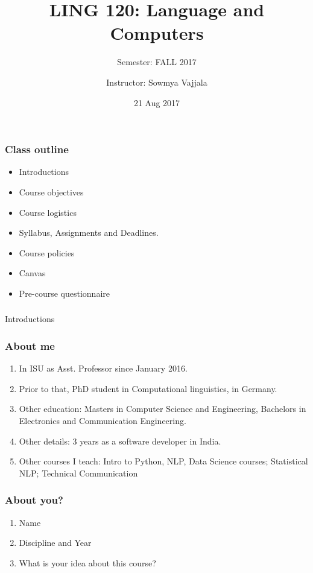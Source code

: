 \documentclass{beamer}
\author[Sowmya Vajjala]{Instructor: Sowmya Vajjala}
\title[LING 120]{LING 120: Language and Computers}
\subtitle{Semester: FALL 2017}
\date{21 Aug 2017}
\institute{Iowa State University, USA}
\begin{document}
\begin{frame}\titlepage
\end{frame}

\begin{frame}
\frametitle{Class outline}
\begin{itemize}
\item Introductions %
\item Course objectives %
\item Course logistics %
\item Syllabus, Assignments and Deadlines. %
\item Course policies %
\item Canvas %
\item Pre-course questionnaire %
\end{itemize}
\end{frame}

\begin{frame}
\frametitle{}
\begin{center}
\Large Introductions
\end{center}
\end{frame}

\begin{frame}
\frametitle{About me}
\begin{enumerate}
\item In ISU as Asst. Professor since January 2016.
\item Prior to that, PhD student in Computational linguistics, in Germany.
\item Other education: Masters in Computer Science and Engineering, Bachelors in Electronics and Communication Engineering.
\item Other details: 3 years as a software developer in India.
\item Other courses I teach: Intro to Python, NLP, Data Science courses; Statistical NLP; Technical Communication
\end{enumerate}
\end{frame}

\begin{frame}
\frametitle{About you?}
\begin{enumerate}
\item Name
\item Discipline and Year
\item What is your idea about this course? 
\end{enumerate}
\end{frame}
\end{document}
